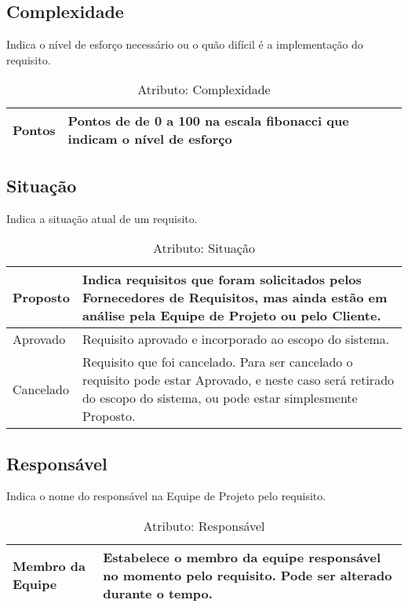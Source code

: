 \subsection{Complexidade}
  Indica o nível de esforço necessário ou o quão difícil é a implementação do requisito.
\begin{table}[H]
  \centering
    \begin{tabular}{| m{5em} | m{10cm} |}
      \hline
      Pontos     &  Pontos de de 0 a 100 na escala fibonacci que indicam o nível de esforço  \\ \hline
  \end{tabular}
  \caption{Atributo: Complexidade }
    \label{tabela:atributo_estabilidade}
\end{table}

\subsection{Situação}
   Indica a situação atual de um requisito.
\begin{table}[H]
  \centering
    \begin{tabular}{| m{5em} | m{10cm} |}
      \hline
      Proposto     & Indica requisitos que foram solicitados pelos Fornecedores de Requisitos, mas ainda estão em análise pela Equipe de Projeto ou pelo Cliente.   \\ \hline
      Aprovado & Requisito aprovado e incorporado ao escopo do sistema. \\ \hline
      Cancelado & Requisito que foi cancelado. Para ser cancelado o requisito pode estar Aprovado, e neste caso será retirado do escopo do sistema, ou pode estar simplesmente Proposto.   \\ \hline
    \end{tabular}
    \caption{Atributo: Situação }
    \label{tabela:atributo_estabilidade}
\end{table}

\subsection{Responsável}
  Indica o nome do responsável na Equipe de Projeto pelo requisito.
\begin{table}[H]
  \centering
    \begin{tabular}{| m{5em} | m{10cm} |}
      \hline
      Membro da Equipe     & Estabelece o membro da equipe responsável no momento pelo requisito. Pode ser alterado durante o tempo.   \\ \hline
    \end{tabular}
    \caption{Atributo: Responsável }
    \label{tabela:atributo_estabilidade}
\end{table}


